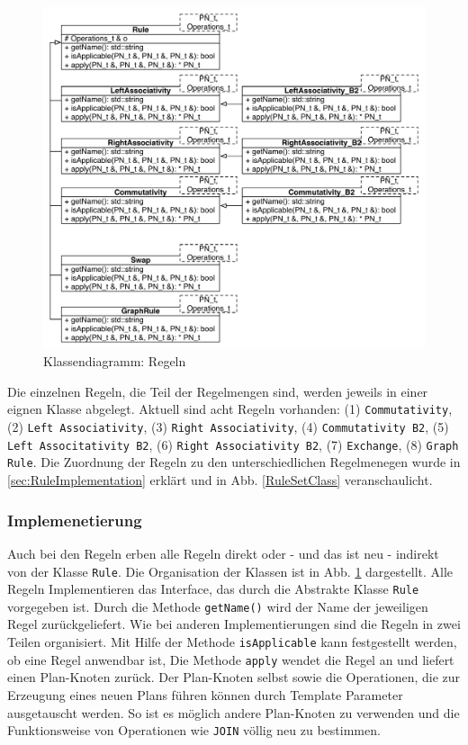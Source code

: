 \begin{figure}[ht]
  \centering
  \includegraphics[height=\textwidth]{04_Implementierung/00_media/Rules.pdf}
  \caption{Klassendiagramm: Regeln}
  \label{RuleClassDiagram}
\end{figure}

Die einzelnen Regeln, die Teil der Regelmengen sind, werden jeweils in einer eignen Klasse abgelegt. Aktuell sind acht Regeln vorhanden: (1) \texttt{Commutativity}, (2) \texttt{Left Associativity}, (3) \texttt{Right Associativity}, (4) \texttt{Commutativity B2}, (5) \texttt{Left Associtativity B2}, (6) \texttt{Right Associativity B2}, (7) \texttt{Exchange}, (8) \texttt{Graph Rule}. Die Zuordnung der Regeln zu den unterschiedlichen Regelmenegen wurde in \ref{sec:RuleImplementation} erklärt und in Abb. \ref{RuleSetClass} veranschaulicht.

\subsubsection{Implemenetierung}


Auch bei den Regeln erben alle Regeln direkt oder - und das ist neu - indirekt von der Klasse \texttt{Rule}. Die Organisation der Klassen ist in Abb. \ref{RuleClassDiagram} dargestellt. Alle Regeln Implementieren das Interface, das durch die Abstrakte Klasse \texttt{Rule} vorgegeben ist. Durch die Methode \texttt{getName()} wird der Name der jeweiligen Regel zurückgeliefert. Wie bei anderen Implementierungen sind die Regeln in zwei Teilen organisiert. Mit Hilfe der Methode \texttt{isApplicable} kann festgestellt werden, ob eine Regel anwendbar ist, Die Methode \texttt{apply} wendet die Regel an und liefert einen Plan-Knoten zurück. Der Plan-Knoten selbst sowie die Operationen, die zur Erzeugung eines neuen Plans führen können durch Template Parameter ausgetauscht werden. So ist es möglich andere Plan-Knoten zu verwenden und die Funktionsweise von Operationen wie \texttt{JOIN} völlig neu zu bestimmen.


